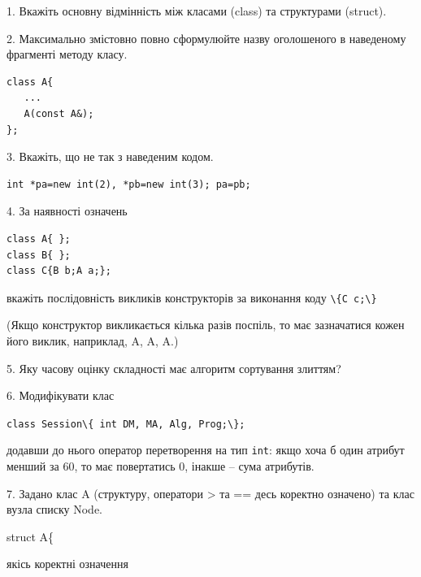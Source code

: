 \documentclass[12pt, ukrainian]{article}
\def\code#1{\Verb!#1!}
\begin{document}
{%
1. Вкажіть основну відмінність між класами (class) та структурами (struct).%
\par
\vspace{2mm}
2. Максимально змістовно повно сформулюйте назву оголошеного в наведеному фрагменті методу класу.
\vspace{-3mm}
\begin{verbatim}class A{
   ...
   A(const A&);
};\end{verbatim}
\vspace{-3mm}
\par
\vspace{2mm}
3. Вкажіть, що не так з наведеним кодом.
\vspace{-3mm}
\begin{verbatim}int *pa=new int(2), *pb=new int(3); pa=pb;\end{verbatim}
\vspace{-3mm}
\par
\vspace{2mm}
4. За наявності означень
\vspace{-3mm}
\begin{verbatim}
class A{ };
class B{ };
class C{B b;A a;};\end{verbatim}
\vspace{-3mm}
вкажіть послідовність викликів конструкторів за виконання коду \code{\{C c;\}} 

(Якщо конструктор викликається кілька разів поспіль, то має зазначатися кожен його виклик, наприклад, A, A, A.)

\vspace{2mm}
5. Яку часову оцінку складності має алгоритм сортування злиттям?
\par
\vspace{2mm}
6. Модифікувати клас 

\qquad\code{class Session\{ int DM, MA, Alg, Prog;\};} 


додавши до нього оператор перетворення на тип \code{int}: якщо хоча б один атрибут менший за 60, то має повертатись 0, інакше -- сума атрибутів.%
\par
\vspace{2mm}
7. 
Задано клас A (структуру, оператори > та == десь коректно означено) та клас вузла списку Node.

struct A\{

\quad  якісь коректні означення 

}
\end{document}
